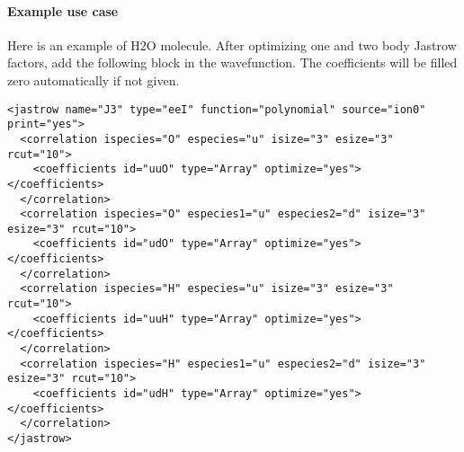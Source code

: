 \paragraph{Example use case}
Here is an example of H2O molecule. After optimizing one and two body Jastrow factors, add the following block in the wavefunction.
The coefficients will be filled zero automatically if not given.
\begin{lstlisting}[style=QMCPXML]
<jastrow name="J3" type="eeI" function="polynomial" source="ion0" print="yes">
  <correlation ispecies="O" especies="u" isize="3" esize="3" rcut="10">
    <coefficients id="uuO" type="Array" optimize="yes"> </coefficients>
  </correlation>
  <correlation ispecies="O" especies1="u" especies2="d" isize="3" esize="3" rcut="10">
    <coefficients id="udO" type="Array" optimize="yes"> </coefficients>
  </correlation>
  <correlation ispecies="H" especies="u" isize="3" esize="3" rcut="10">
    <coefficients id="uuH" type="Array" optimize="yes"> </coefficients>
  </correlation>
  <correlation ispecies="H" especies1="u" especies2="d" isize="3" esize="3" rcut="10">
    <coefficients id="udH" type="Array" optimize="yes"> </coefficients>
  </correlation>
</jastrow>
\end{lstlisting}
